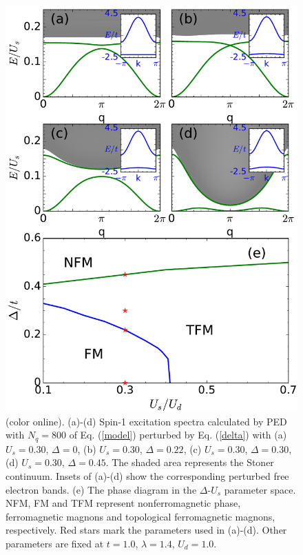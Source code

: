 \documentclass[amsmath,superscriptaddress,showpacs,aps,prb,twocolumn]{revtex4-1}
\begin{document}
\begin{figure}
\includegraphics[scale=0.46]{delta_spectrum}
\caption{(color online). (a)-(d) Spin-1 excitation spectra calculated by PED with $N_q=800$ of Eq. (\ref{model}) perturbed by Eq. (\ref{delta}) with (a) $U_s=0.30$, $\Delta=0$, (b) $U_s=0.30$, $\Delta=0.22$, (c) $U_s=0.30$, $\Delta=0.30$, (d) $U_s=0.30$, $\Delta=0.45$. The shaded area represents the Stoner continuum. Insets of (a)-(d) show the corresponding perturbed free electron bands. (e) The phase diagram in the $\Delta$-$U_s$ parameter space. NFM, FM and TFM represent nonferromagnetic phase, ferromagnetic magnons and topological ferromagnetic magnons, respectively. Red stars mark the parameters used in (a)-(d). Other parameters are fixed at $t=1.0$, $\lambda=1.4$, $U_d=1.0$.}
\label{dspectrum}
\end{figure}
\end{document}
